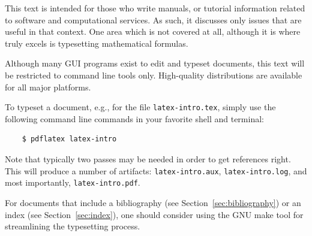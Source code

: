 \documentclass[11pt,a4paper,oneside]{book}
\begin{document}
This text is intended for those who write manuals, or tutorial information related to software and computational services.  As such, it discusses only issues that are useful in that context.  One area which is not covered at all, although it is where \LaTeXe{} truly excels is typesetting mathematical formulas.

Although many GUI programs exist to edit and typeset \LaTeXe{} documents, this text will be restricted to command line tools only.  High-quality distributions are available for all major platforms.

To typeset a document, e.g., for the file \verb|latex-intro.tex|, simply use the following command line commands in your favorite shell and terminal:
\begin{verbatim}
    $ pdflatex latex-intro
\end{verbatim}
Note that typically two passes may be needed in order to get references right.  This will produce a number of artifacts: \verb|latex-intro.aux|, \verb|latex-intro.log|, and most importantly, \verb|latex-intro.pdf|.

For documents that include a bibliography (see Section~\ref{sec:bibliography}) or an index (see Section~\ref{sec:index}), one should consider using the GNU make tool for streamlining the typesetting process.
\end{document}
